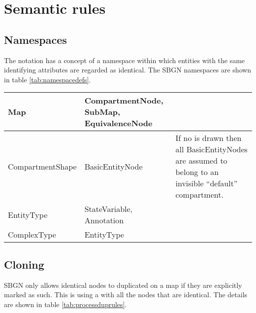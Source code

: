 \section{Semantic rules}

\subsection{Namespaces}

The notation has a concept of a namespace within which entities with the same 
identifying attributes are regarded as identical. The SBGN namespaces are shown 
in table \ref{tab:namespacedefs}.


\begin{center}
\label{tab:namespacedefs}
\begin{small}
\tablelasttail{\hline}
\begin{supertabular}{|l|p{5cm}|p{5cm}|}\hline
%
Map & CompartmentNode, SubMap, EquivalenceNode & \\\hline
%
CompartmentShape & BasicEntityNode & If no  is drawn then all BasicEntityNodes are assumed to belong to an invisible ``default'' compartment.\\\hline
EntityType & StateVariable, Annotation & \\\hline
ComplexType & EntityType & \\\hline
\end{supertabular}
\end{small}
\end{center}

\subsection{Cloning}

SBGN only allows identical nodes to duplicated on a map if they are
explicitly marked as such. This is using a  with all the
nodes that are identical. The details are shown in table \ref{tab:processduprules}.


